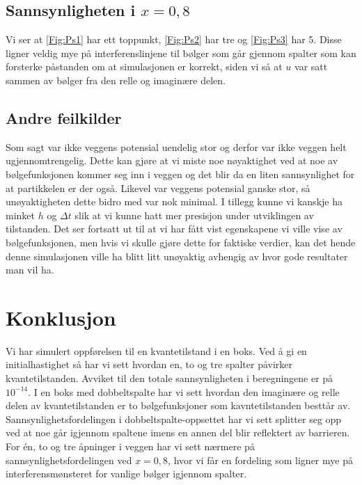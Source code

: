 \documentclass[reprint,english,notitlepage]{revtex4-2}  %
\begin{document}
\subsection{Sannsynligheten i $x=0,8$}
Vi ser at \autoref{Fig:Ps1} har ett toppunkt, \autoref{Fig:Ps2} har tre og \autoref{Fig:Ps3} har 5. Disse ligner veldig mye på interferenslinjene til bølger som går gjennom spalter som kan forsterke påstanden om at simulasjonen er korrekt, siden vi så at $u$ var satt sammen av bølger fra den relle og imaginære delen. 
\subsection{Andre feilkilder}
Som sagt var ikke veggens potensial uendelig stor og derfor var ikke veggen helt ugjennomtrengelig. Dette kan gjøre at vi miste noe nøyaktighet ved at noe av bølgefunksjonen kommer seg inn i veggen og det blir da en liten sannsynlighet for at partikkelen er der også. Likevel var veggens potensial ganske stor, så unøyaktigheten dette bidro med var nok minimal.
\newline I tillegg kunne vi kanskje ha minket $h$ og $\Delta t$ slik at vi kunne hatt mer presisjon under utviklingen av tilstanden. Det ser fortsatt ut til at vi har fått vist egenskapene vi ville vise av bølgefunksjonen, men hvis vi skulle gjøre dette for faktiske verdier, kan det hende denne simulasjonen ville ha blitt litt unøyaktig avhengig av hvor gode resultater man vil ha.
\section{Konklusjon}
Vi har simulert oppførelsen til en kvantetilstand i en boks. Ved å gi en initialhastighet så har vi sett hvordan en, to og tre spalter påvirker kvantetilstanden. Avviket til den totale sannsynligheten i beregningene er på $10^{-14}$. I en boks med dobbeltspalte har vi sett hvordan den imaginære og relle delen av kvantetilstanden er to bølgefunksjoner som kavntetilstanden besttår av. Sannsynlighetsfordelingen i dobbeltspalte-oppsettet har vi sett splitter seg opp ved at noe går igjennom spaltene imens en annen del blir reflektert av barrieren. For én, to og tre åpninger i veggen har vi sett nærmere på sannsynlighetsfordelingen ved $x = 0,8$, hvor vi får en fordeling som ligner mye på interferensmønsteret for vanlige bølger igjennom spalter.



\end{document}
